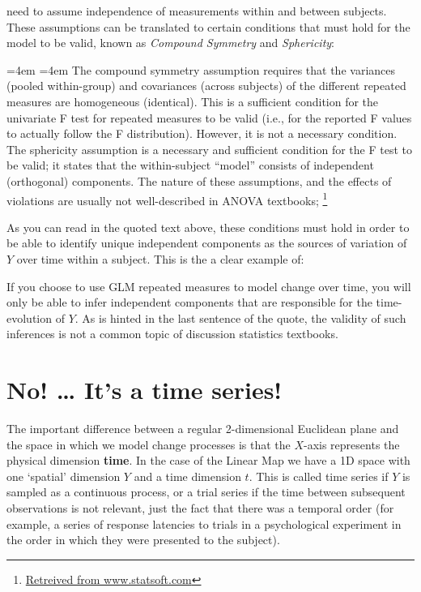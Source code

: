 \documentclass[12pt,]{book}
\let\rmarkdownfootnote\footnote%
\def\footnote{\protect\rmarkdownfootnote}
\renewenvironment{quote}{%
  \par \small \medskip \block
  \leftskip=4em \rightskip=4em%
  \noindent \ignorespaces}{%
  \par \medskip
  }
\let\stdsection\section
\renewcommand\section{\newpage\stdsection}
\begin{document}
need to assume independence of measurements within and between subjects. These assumptions can be translated to certain conditions that must hold for the model to be valid, known as \emph{Compound Symmetry} and \emph{Sphericity}:

\begin{quote}
The compound symmetry assumption requires that the variances (pooled within-group) and covariances (across subjects) of the different repeated measures are homogeneous (identical). This is a sufficient condition for the univariate F test for repeated measures to be valid (i.e., for the reported F values to actually follow the F distribution). However, it is not a necessary condition. The sphericity assumption is a necessary and sufficient condition for the F test to be valid; it states that the within-subject ``model'' consists of independent (orthogonal) components. The nature of these assumptions, and the effects of violations are usually not well-described in ANOVA textbooks; \footnote{\href{https://www.statsoft.com/Textbook/ANOVA-MANOVA\#sphericity}{Retreived from www.statsoft.com}}
\end{quote}

As you can read in the quoted text above, these conditions must hold in order to be able to identify unique independent components as the sources of variation of \(Y\) over time within a subject. This is the a clear example of:

If you choose to use GLM repeated measures to model change over time, you will only be able to infer independent components that are responsible for the time-evolution of \(Y\). As is hinted in the last sentence of the quote, the validity of such inferences is not a common topic of discussion statistics textbooks.

\hypertarget{no-its-a-time-series}{%
\section{\texorpdfstring{\textbf{No! \ldots{} It's a time series!}}{No! \ldots{} It's a time series!}}\label{no-its-a-time-series}}

The important difference between a regular 2-dimensional Euclidean plane and the space in which we model change processes is that the \(X\)-axis represents the physical dimension \textbf{time}. In the case of the Linear Map we have a 1D space with one `spatial' dimension \(Y\) and a time dimension \(t\). This is called time series if \(Y\) is sampled as a continuous process, or a trial series if the time between subsequent observations is not relevant, just the fact that there was a temporal order (for example, a series of response latencies to trials in a psychological experiment in the order in which they were presented to the subject).
\end{document}
